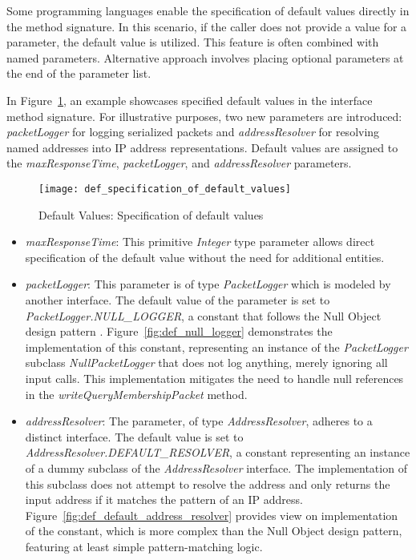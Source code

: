 Some programming languages enable the specification of default values directly in the method signature.
In this scenario, if the caller does not provide a value for a parameter, the default value is utilized.
This feature is often combined with named parameters.
Alternative approach involves placing optional parameters at the end of the parameter list.

In Figure~\ref{fig:def_specification_of_default_values}, an example showcases specified default values
in the interface method signature.
For illustrative purposes, two new parameters are introduced: \textit{packetLogger} for logging serialized packets
and \textit{addressResolver} for resolving named addresses into IP address representations.
Default values are assigned to the \textit{maxResponseTime}, \textit{packetLogger},
and \textit{addressResolver} parameters.

\begin{figure}[!htb]
    \centering
    \texttt{[image: def\_specification\_of\_default\_values]}
    \caption{Default Values: Specification of default values}
    \label{fig:def_specification_of_default_values}
\end{figure}

\begin{itemize}
    \item \textit{maxResponseTime}:
    This primitive \textit{Integer} type parameter allows direct specification of the default value without the need
    for additional entities.
    \item \textit{packetLogger}:
    This parameter is of type \textit{PacketLogger} which is modeled by another interface.
    The default value of the parameter is set to \textit{PacketLogger.NULL\_LOGGER},
    a constant that follows the Null Object design pattern \cite[Chapter~18]{posa4}.
    Figure~\ref{fig:def_null_logger} demonstrates the implementation of this constant, representing an instance
    of the \textit{PacketLogger} subclass \textit{NullPacketLogger} that does not log anything, merely ignoring
    all input calls.
    This implementation mitigates the need to handle null references in the \textit{writeQueryMembershipPacket} method.
    \item \textit{addressResolver}:
    The parameter, of type \textit{AddressResolver}, adheres to a distinct interface.
    The default value is set to \textit{AddressResolver.DEFAULT\_RESOLVER}, a constant representing an instance
    of a dummy subclass of the \textit{AddressResolver} interface.
    The implementation of this subclass does not attempt to resolve the address and only returns the input address
    if it matches the pattern of an IP address.
    Figure~\ref{fig:def_default_address_resolver} provides view on implementation of the constant,
    which is more complex than the Null Object design pattern, featuring at least simple pattern-matching logic.
\end{itemize}


